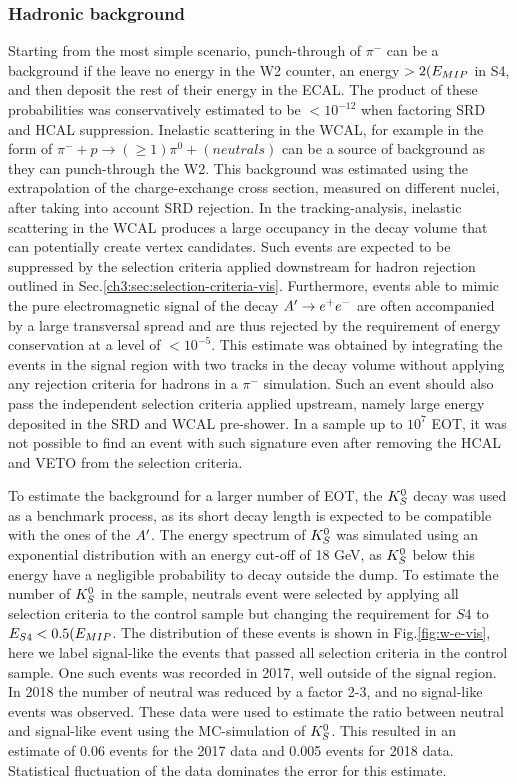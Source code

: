 \subsubsection{Hadronic background}
\label{ch3:sec:bkg:vis:hadr}

Starting from the most simple scenario, punch-through of $\pi^-$ can be a background if the leave no energy in the W2 counter, an energy $> 2(E_{MIP}$ in S4, and then deposit the rest of their energy in the ECAL. The product of these probabilities was conservatively estimated to be $< 10^{-12}$ when factoring SRD and HCAL suppression. Inelastic scattering in the WCAL, for example in the form of $\pi^- + p \rightarrow (\geq 1)\pi^0 + (neutrals)$ can be a source of background as they can punch-through the W2. This background was estimated using the extrapolation of the charge-exchange cross section, measured on different nuclei, after taking into account SRD rejection. In the tracking-analysis, inelastic scattering in the WCAL produces a large occupancy in the decay volume that can potentially create vertex candidates. Such events are expected to be suppressed by the selection criteria applied downstream for hadron rejection outlined in Sec.\ref{ch3:sec:selection-criteria-vis}. Furthermore, events able to mimic the pure electromagnetic signal of the decay $A' \rightarrow e^+ e^-$ are often accompanied by a large transversal spread and are thus rejected by the requirement of energy conservation at a level of $< 10^{-5}$. This estimate was obtained by integrating the events in the signal region with two tracks in the decay volume without applying any rejection criteria for hadrons in a $\pi^-$ simulation. Such an event should also pass the independent selection criteria applied upstream, namely large energy deposited in the SRD and WCAL pre-shower. In a sample up to $10^7$ EOT, it was not possible to find an event with such signature even after removing the HCAL and VETO from the selection criteria.

To estimate the background for a larger number of EOT, the $K^0_S$ decay was used as a benchmark process, as its short decay length is expected to be compatible with the ones of the $A'$. The energy spectrum of $K^0_S$ was simulated using an exponential distribution with an energy cut-off of 18 GeV, as $K^0_S$ below this energy have a negligible probability to decay outside the dump. To estimate the number of $K^0_S$ in the sample, neutrals event were selected by applying all selection criteria to the control sample but changing the requirement for $S4$ to $E_{S4} < 0.5 (E_{MIP}$. The distribution of these events is shown in Fig.\ref{fig:w-e-vis}, here we label signal-like the events that passed all selection criteria in the control sample. One such events was recorded in 2017, well outside of the signal region. In 2018 the number of neutral was reduced by a factor 2-3, and no signal-like events was observed. These data were used to estimate the ratio between neutral and signal-like event using the MC-simulation of $K^0_S$. This resulted in an estimate of 0.06 events for the 2017 data and 0.005 events for 2018 data. Statistical fluctuation of the data dominates the error for this estimate.

